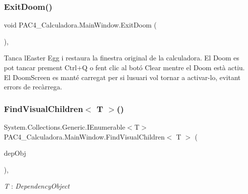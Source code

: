 \subsubsection{\texorpdfstring{Exit\+Doom()}{ExitDoom()}\hspace{0.1cm}{\footnotesize\ttfamily [2/2]}}
{\footnotesize\ttfamily void P\+A\+C4\+\_\+\+Calculadora.\+Main\+Window.\+Exit\+Doom (\begin{DoxyParamCaption}{ }\end{DoxyParamCaption})\hspace{0.3cm}{\ttfamily [inline]}, {\ttfamily [private]}}



Tanca l\textquotesingle{}Easter Egg i restaura la finestra original de la calculadora. El Doom es pot tancar prement Ctrl+Q o fent clic al botó Clear mentre el Doom està actiu. ~\newline
El Doom\+Screen es manté carregat per si l\textquotesingle{}usuari vol tornar a activar-\/lo, evitant errors de recàrrega. 

\mbox{\label{class_p_a_c4___calculadora_1_1_main_window_a6c67cf368bc6cddc47d21def635bb27b}} 
\subsubsection{\texorpdfstring{Find\+Visual\+Children$<$ T $>$()}{FindVisualChildren< T >()}\hspace{0.1cm}{\footnotesize\ttfamily [1/2]}}
{\footnotesize\ttfamily System.\+Collections.\+Generic.\+I\+Enumerable$<$T$>$ P\+A\+C4\+\_\+\+Calculadora.\+Main\+Window.\+Find\+Visual\+Children$<$ T $>$ (\begin{DoxyParamCaption}\item[{Dependency\+Object}]{dep\+Obj }\end{DoxyParamCaption})\hspace{0.3cm}{\ttfamily [inline]}, {\ttfamily [private]}}

\begin{Desc}
\item[Type Constraints]\begin{description}
\item[{\em T} : {\em Dependency\+Object}]\end{description}
\end{Desc}
\mbox{\label{class_p_a_c4___calculadora_1_1_main_window_a6c67cf368bc6cddc47d21def635bb27b}} 
